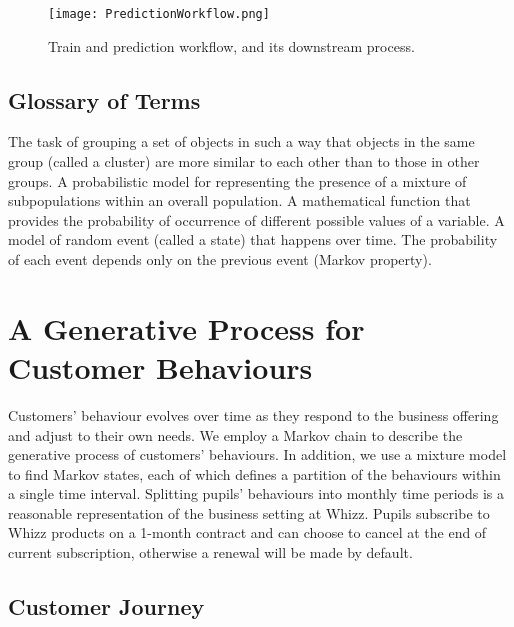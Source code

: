 \documentclass[english,a4,oneside,9pt]{extarticle}
\begin{document}
\begin{figure}[htb]
\centering
\texttt{[image: PredictionWorkflow.png]}
\caption{Train and prediction workflow, and its downstream process.}
\label{fig:workflow}
\end{figure} 

\subsection*{Glossary of Terms}

\begin{infommitemize}
	 The task of grouping a set of objects in such a way that objects in the same group (called a cluster) are more similar to each other than to those in other groups.
	 A probabilistic model for representing the presence of a mixture of subpopulations within an overall population.
	 A mathematical function that provides the probability of occurrence of different possible values of a variable.
	 A model of random event (called a state) that happens over time. The probability of each event depends only on the previous event (Markov property).
\end{infommitemize}

\section{A Generative Process for Customer Behaviours}

Customers' behaviour evolves over time as they respond to the business offering and adjust to their own needs. We employ a Markov chain to describe the generative process of customers' behaviours. In addition, we use a mixture model to find Markov states, each of which defines a partition of the behaviours within a single time interval. Splitting pupils' behaviours into monthly time periods is a reasonable representation of the business setting at Whizz. Pupils subscribe to Whizz products on a 1-month contract and can choose to cancel at the end of current subscription, otherwise a renewal will be made by default.

\subsection*{Customer Journey}

\end{document}
